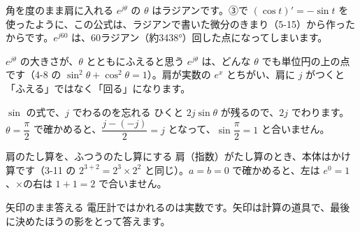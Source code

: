 
\begin{tsumazuki}{角を度のまま肩に入れる}
$e^{j\theta}$ の $\theta$ はラジアンです。③で $(\cos t)'=-\sin t$ を使ったように、この公式は、ラジアンで書いた微分のきまり（5-15）から作ったからです。$e^{j60}$ は、60ラジアン（約3438°）回した点になってしまいます。
\end{tsumazuki}

\begin{tsumazuki}{$e^{j\theta}$ の大きさが、$\theta$ とともにふえると思う}
$e^{j\theta}$ は、どんな $\theta$ でも単位円の上の点です（4-8 の $\sin^2\theta+\cos^2\theta=1$）。肩が実数の $e^{x}$ とちがい、肩に $j$ がつくと「ふえる」ではなく「回る」になります。
\end{tsumazuki}

\begin{tsumazuki}{$\sin$ の式で、$j$ でわるのを忘れる}
ひくと $2j\sin\theta$ が残るので、$2j$ でわります。$\theta=\dfrac{\pi}{2}$ で確かめると、$\dfrac{j-(-j)}{2}=j$ となって、$\sin\dfrac{\pi}{2}=1$ と合いません。
\end{tsumazuki}

\begin{tsumazuki}{肩のたし算を、ふつうのたし算にする}
肩（指数）がたし算のとき、本体はかけ算です（3-11 の $2^{3+2}=2^3\times2^2$ と同じ）。$a=b=0$ で確かめると、左は $e^0=1$、×の右は $1+1=2$ で合いません。
\end{tsumazuki}

\begin{tsumazuki}{矢印のまま答える}
電圧計ではかれるのは実数です。矢印は計算の道具で、最後に決めたほうの影をとって答えます。
\end{tsumazuki}

